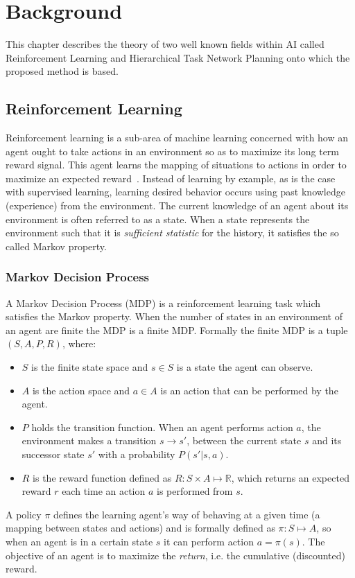 \chapter{Background}
\label{Chapter2}
This chapter describes the theory of two well known fields within AI called
Reinforcement Learning and Hierarchical Task Network Planning onto which the
proposed method is based.

\section{Reinforcement Learning}
Reinforcement learning is a sub-area of machine learning concerned with how an
agent ought to take actions in an environment so as to maximize its long term
reward signal. This agent learns the mapping of situations to actions in order
to maximize an expected reward~\cite{sutton}.  Instead of learning by example,
as is the case with supervised learning, learning desired behavior occurs using
past knowledge (experience) from the environment. The current knowledge of an
agent about its environment is often referred to as a state. When a state
represents the environment such that it is \emph{sufficient statistic} for the
history, it satisfies the so called Markov property.

\subsection{Markov Decision Process}
A Markov Decision Process (MDP) is a reinforcement learning task which
satisfies the Markov property. When the number of states in an environment of
an agent are finite the MDP is a finite MDP. Formally the finite MDP is a tuple
$(S,A,P,R)$, where:
\begin{itemize}
\item{$S$ is the finite state space and $s \in S$ is a state the agent can
observe.}
\item{$A$ is the action space and $a \in A$ is an action that can be performed
by the agent.}
\item{$P$ holds the transition function. When an agent performs action $a$, the
environment makes a transition $s \rightarrow s'$, between the current state
$s$ and its successor state $s'$ with a probability $P(s'|s,a)$.}
\item{$R$ is the reward function defined as $R:S \times A \mapsto \mathbb{R}$,
which returns an expected reward $r$ each time an action $a$ is performed from
$s$. }
\end{itemize}
A policy $\pi$ defines the learning agent's way of behaving at a given time (a
mapping between states and actions) and is formally defined as $\pi : S \mapsto
A$, so when an agent is in a certain state $s$ it can perform action $a =
\pi(s)$. The objective of an agent is to maximize the \emph{return}, i.e. the
cumulative (discounted) reward.

